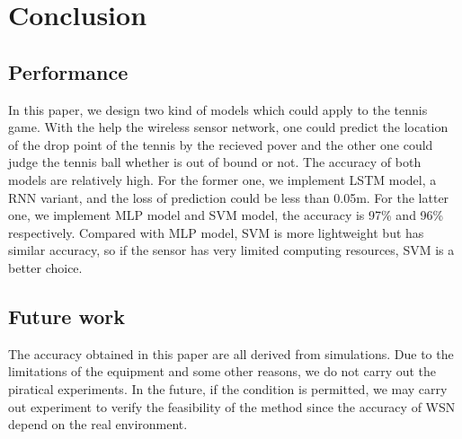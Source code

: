 \section{Conclusion}
\subsection{Performance}
In this paper, we design two kind of models which could apply to the tennis game. With the help the wireless sensor network, one could predict the location of the drop point of the tennis by the recieved pover and the other one could judge the tennis ball whether is out of bound or not. The accuracy of both models are relatively high. For the former one, we implement LSTM model, a RNN variant, and the loss of prediction could be less than 0.05m. For the latter one, we implement MLP model and SVM model, the accuracy is 97\% and 96\% respectively. Compared with MLP model, SVM is more lightweight but has similar accuracy, so if the sensor has very limited computing resources, SVM is a better choice.
\subsection{Future work}
The accuracy obtained in this paper are all derived from simulations. Due to the limitations of the equipment and some other reasons, we do not carry out the piratical experiments. In the future, if the condition is permitted, we may carry out experiment to verify the feasibility of the method since the accuracy of WSN depend on the real environment.




